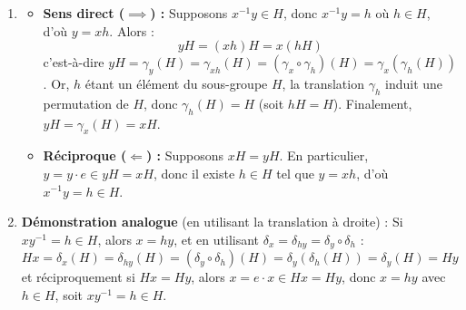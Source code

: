 \documentclass[a4paper,11pt]{article}
\begin{document}
\begin{demonstration}
\begin{enumerate}
    \item \begin{itemize}
        \item \textbf{Sens direct ($\implies$) :} Supposons $x^{-1} y \in H$, donc $x^{-1} y = h$ où $h \in H$, d'où $y = xh$.
        Alors :
        \[
        yH = (xh)H = x(hH)
        \]
        c'est-à-dire $yH = \gamma_y(H) = \gamma_{xh}(H) = (\gamma_x \circ \gamma_h)(H) = \gamma_x(\gamma_h(H))$.
        Or, $h$ étant un élément du sous-groupe $H$, la translation $\gamma_h$ induit une permutation de $H$, donc $\gamma_h(H) = H$ (soit $hH = H$).
        Finalement, $yH = \gamma_x(H) = xH$.
        
        \item \textbf{Réciproque ($\Longleftarrow$) :} Supposons $xH = yH$. En particulier, $y = y \cdot e \in yH = xH$, donc il existe $h \in H$ tel que $y = xh$, d'où $x^{-1} y = h \in H$.
    \end{itemize}
    
    \item \textbf{Démonstration analogue} (en utilisant la translation à droite) :
    Si $xy^{-1} = h \in H$, alors $x = hy$, et en utilisant $\delta_x = \delta_{hy} = \delta_y \circ \delta_h$ :
    \[
    Hx = \delta_x(H) = \delta_{hy}(H) = (\delta_y \circ \delta_h)(H) = \delta_y(\delta_h(H)) = \delta_y(H) = Hy
    \]
    et réciproquement si $Hx = Hy$, alors $x = e \cdot x \in Hx = Hy$, donc $x = hy$ avec $h \in H$, soit $xy^{-1} = h \in H$.
\end{enumerate}
\end{demonstration}
\end{document}
